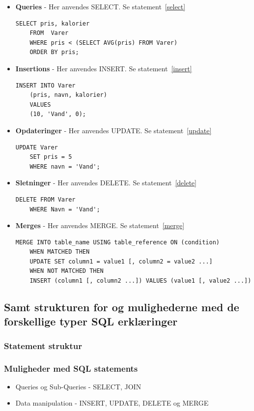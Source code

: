 \begin{itemize}
	\item \textbf{Queries} - Her anvendes SELECT. Se statement~\ref{select}
	\begin{lstlisting}[caption=Query med sub-query,label=select]
	SELECT pris, kalorier
	FROM  Varer
	WHERE pris < (SELECT AVG(pris) FROM Varer)
	ORDER BY pris;
	\end{lstlisting}
	
	\item \textbf{Insertions} - Her anvendes INSERT. Se statement~\ref{insert}
	
	\begin{lstlisting}[caption=Brug af INSERT,label=insert]
	INSERT INTO Varer
	(pris, navn, kalorier)
	VALUES
	(10, 'Vand', 0);
	\end{lstlisting}
	
	\item \textbf{Opdateringer} - Her anvendes UPDATE. Se statement~\ref{update}
	
	\begin{lstlisting}[caption=Brug af UPDATE,label=update]
	UPDATE Varer
	SET pris = 5
	WHERE navn = 'Vand';
	\end{lstlisting}
	
	\item \textbf{Sletninger} - Her anvendes DELETE. Se statement~\ref{delete}
	
	\begin{lstlisting}[caption=brug af DELETE,label=delete]
	DELETE FROM Varer
	WHERE Navn = 'Vand';
	\end{lstlisting}
	
	
	\item \textbf{Merges} - Her anvendes MERGE. Se statement~\ref{merge}
	
	\begin{lstlisting}[caption=Brug af MERGE,label=merge]
	MERGE INTO table_name USING table_reference ON (condition)
	WHEN MATCHED THEN
	UPDATE SET column1 = value1 [, column2 = value2 ...]
	WHEN NOT MATCHED THEN
	INSERT (column1 [, column2 ...]) VALUES (value1 [, value2 ...])
	\end{lstlisting}
\end{itemize}
\subparagraph{}

\subsection{Samt strukturen for og mulighederne med de forskellige typer SQL erklæringer}

\subsubsection{Statement struktur}

\subsubsection{Muligheder med SQL statements}

\begin{itemize}
	\item Queries og Sub-Queries - SELECT, JOIN
	\item Data manipulation - INSERT, UPDATE, DELETE og MERGE
\end{itemize}